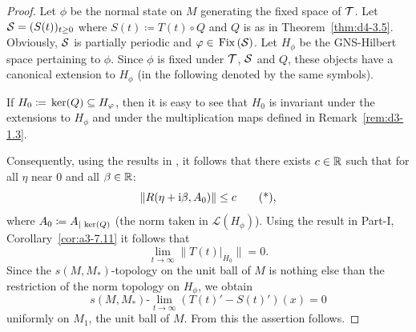 \begin{proof}
Let $ \phi $  be the normal state on $ M $  generating the fixed space of\/ $ \mathcal{T} $.
Let $ \SG = (S(t))_{t \geq 0} $  where $ S(t) \coloneqq T(t) \circ Q $  and $ Q $  is as in Theorem~\ref{thm:d4-3.5}. 
Obviously, $ \mathcal{S} $  is partially periodic and $ \phi \in \Fix{\SG} $.
Let $ H_{\phi} $  be the GNS-Hilbert space pertaining to $ \phi $.
Since $ \phi $  is fixed under $ \mathcal{T} $, $ \mathcal{S} $  and $ Q $,  these objects have a canonical extension to $ H_{\phi} $  (in the following denoted by the same symbols).

If\/ $ H_{0} \coloneqq \Kern{Q} \subseteq H_{\phi} $,  then it is easy to see that $ H_{0} $  is invariant under the extensions to $ H_{\phi} $  and under the multiplication maps defined in Remark~\ref{rem:d3-1.3}.

Consequently, using the results in \textcite{grohkuemmerer:1982}, it follows that there exists $ c \in \mathbb{R} $  such that for all $ \eta $  near $ 0 $  and all $ \beta \in \mathbb{R} $:
\begin{equation}
\|R(\eta + \im\beta, A_{0})\| \leq c \tag{*} ,
\end{equation}
where $ A_{0} \coloneqq A_{|\mathop{}\mathrm{ker}(Q)} $  (the norm taken in $ \mathcal{L}(H_{\phi}) $).
Using the result in Part-I, Corollary~\ref{cor:a3-7.11} it follows that
\[
\lim_{t \to \infty} \|T(t)|_{H_{0}}\| = 0.
\]
Since the $ s(M,M_{*}) $-topology on the unit ball of\/ $ M $  is nothing else than the restriction of the norm topology on $ H_{\phi} $, we obtain
\[
s(M,M_{*})\text{-}\lim_{t \to \infty} (T(t)' - S(t)')(x) = 0
\]
uniformly on $ M_{1} $, the unit ball of $M$.
From this the assertion follows.
\end{proof}
